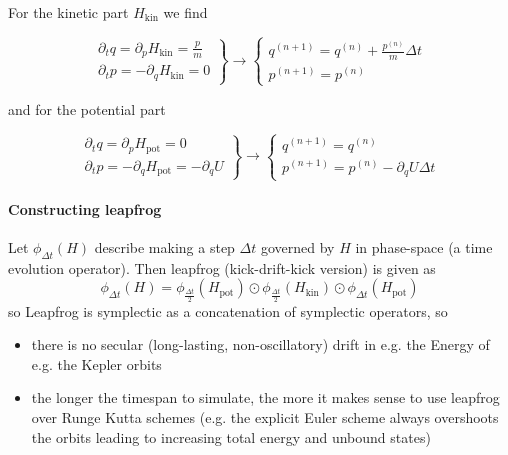 For the kinetic part $H_{\text{kin}}$ we find

\begin{equation}
  \left.\begin{array}{c}
  \partial_t q=\partial_p H_{\text{kin}}=\frac{p}{m} \\
  \partial_t p=-\partial_q H_{\text{kin}}= 0
  \end{array}\right\} \rightarrow\left\{\begin{array}{c}
  q^{(n+1)}=q^{(n)}+\frac{p^{(n)}}{m} \Delta t \\
  p^{(n+1)}=p^{(n)}
  \end{array}\right.
\end{equation}

and for the potential part

\begin{equation}
  \left.\begin{array}{c}
  \partial_t q=\partial_p H_{\text{pot}}=0 \\
  \partial_t p=-\partial_q H_{\text{pot}}= -\partial_q U
  \end{array}\right\} \rightarrow\left\{\begin{array}{c}
  q^{(n+1)}=q^{(n)} \\
  p^{(n+1)}=p^{(n)} - \partial_q U \Delta t
  \end{array}\right.
\end{equation}


\paragraph{Constructing leapfrog} Let $\phi_{\Delta t}(H)$ describe making a step $\Delta t$ governed by $H$ in phase-space
(a time evolution operator). Then leapfrog (kick-drift-kick version) is given as
\begin{equation}
  \phi_{\Delta t}(H) = \phi_{\frac{\Delta t}{2}}(H_{\text{pot}}) \odot \phi_{\frac{\Delta t}{2}}(H_{\text{kin}}) \odot \phi_{\Delta t}(H_{\text{pot}})
\end{equation}
\textcolor{blue1}{so Leapfrog is symplectic as a concatenation of symplectic operators}, so
\begin{itemize}
  \item there is no secular (long-lasting, non-oscillatory) drift in e.g. the Energy of e.g. the Kepler orbits
  \item the longer the timespan to simulate, the more it makes sense to use leapfrog over Runge Kutta schemes (e.g. the explicit Euler scheme always overshoots the orbits leading to increasing total energy and unbound states)
\end{itemize}

